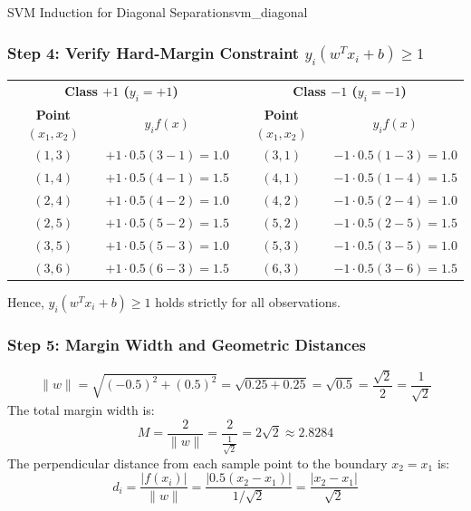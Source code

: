 \begin{example}{SVM Induction for Diagonal Separation}{svm_diagonal}
\subsubsection{Step 4: Verify Hard-Margin Constraint \texorpdfstring{$y_i(w^T x_i + b) \ge 1$}{yi(w^T xi + b) >= 1}}

\begin{center}\small
\begin{tabular}{cc|cc}
\toprule
\multicolumn{2}{c|}{\textbf{Class $+1$ ($y_i = +1$)}} & \multicolumn{2}{c}{\textbf{Class $-1$ ($y_i = -1$)}} \\
\textbf{Point $(x_1, x_2)$} & $y_i f(x)$ & \textbf{Point $(x_1, x_2)$} & $y_i f(x)$ \\
\midrule
$(1, 3)$ & $+1 \cdot 0.5(3 - 1) = 1.0$ & $(3, 1)$ & $-1 \cdot 0.5(1 - 3) = 1.0$ \\
$(1, 4)$ & $+1 \cdot 0.5(4 - 1) = 1.5$ & $(4, 1)$ & $-1 \cdot 0.5(1 - 4) = 1.5$ \\
$(2, 4)$ & $+1 \cdot 0.5(4 - 2) = 1.0$ & $(4, 2)$ & $-1 \cdot 0.5(2 - 4) = 1.0$ \\
$(2, 5)$ & $+1 \cdot 0.5(5 - 2) = 1.5$ & $(5, 2)$ & $-1 \cdot 0.5(2 - 5) = 1.5$ \\
$(3, 5)$ & $+1 \cdot 0.5(5 - 3) = 1.0$ & $(5, 3)$ & $-1 \cdot 0.5(3 - 5) = 1.0$ \\
$(3, 6)$ & $+1 \cdot 0.5(6 - 3) = 1.5$ & $(6, 3)$ & $-1 \cdot 0.5(3 - 6) = 1.5$ \\
\bottomrule
\end{tabular}
\end{center}
Hence, $y_i (w^T x_i + b) \ge 1$ holds strictly for all observations.

\subsubsection{Step 5: Margin Width and Geometric Distances}
\begin{equation}
\|w\| = \sqrt{(-0.5)^2 + (0.5)^2} = \sqrt{0.25 + 0.25} = \sqrt{0.5} = \frac{\sqrt{2}}{2} = \frac{1}{\sqrt{2}}
\end{equation}
The total margin width is:
\begin{equation}
M = \frac{2}{\|w\|} = \frac{2}{\frac{1}{\sqrt{2}}} = 2\sqrt{2} \approx 2.8284
\end{equation}
The perpendicular distance from each sample point to the boundary $x_2 = x_1$ is:
\begin{equation}
d_i = \frac{|f(x_i)|}{\|w\|} = \frac{|0.5(x_2 - x_1)|}{1/\sqrt{2}} = \frac{|x_2 - x_1|}{\sqrt{2}}
\end{equation}


\end{example}
